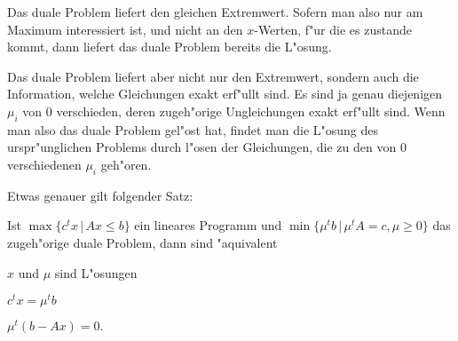 Das duale Problem liefert den gleichen Extremwert.
Sofern man also nur am Maximum interessiert ist, und nicht an den $x$-Werten,
f"ur die es zustande kommt, dann liefert das duale Problem bereits die
L"osung.

Das duale Problem liefert aber nicht nur den Extremwert, sondern
auch die Information, welche Gleichungen exakt erf"ullt sind.
Es sind ja genau diejenigen $\mu_i$ von $0$ verschieden, deren
zugeh"orige Ungleichungen exakt erf"ullt sind. Wenn man also
das duale Problem gel"ost hat, findet man die L"osung des urspr"unglichen
Problems durch l"osen der Gleichungen, die zu den von $0$ verschiedenen
$\mu_i$ geh"oren.

Etwas genauer gilt folgender Satz:
\begin{satz}
Ist $\max\{c^tx\,|\, Ax\le b\}$ ein lineares Programm und 
$\min\{\mu^tb\,|\, \mu^t A=c, \mu \ge 0\}$ das zugeh"orige duale Problem,
dann sind "aquivalent
\begin{compactenum}
\item $x$ und $\mu$ sind L"osungen
\item $c^tx=\mu^tb$
\item $\mu^t(b-Ax)=0.$
\end{compactenum}
\end{satz}

